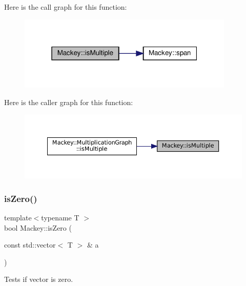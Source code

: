 Here is the call graph for this function\+:\nopagebreak
\begin{figure}[H]
\begin{center}
\leavevmode
\includegraphics[width=292pt]{namespaceMackey_af70b0c547f7121b8815885dfebde67d9_cgraph}
\end{center}
\end{figure}
Here is the caller graph for this function\+:\nopagebreak
\begin{figure}[H]
\begin{center}
\leavevmode
\includegraphics[width=350pt]{namespaceMackey_af70b0c547f7121b8815885dfebde67d9_icgraph}
\end{center}
\end{figure}
\mbox{\label{namespaceMackey_a4c3647777bc890a4649ae24b138bbb79}} 
\subsubsection{\texorpdfstring{is\+Zero()}{isZero()}}
{\footnotesize\ttfamily template$<$typename T $>$ \\
bool Mackey\+::is\+Zero (\begin{DoxyParamCaption}\item[{const std\+::vector$<$ T $>$ \&}]{a }\end{DoxyParamCaption})}



Tests if vector is zero. 

